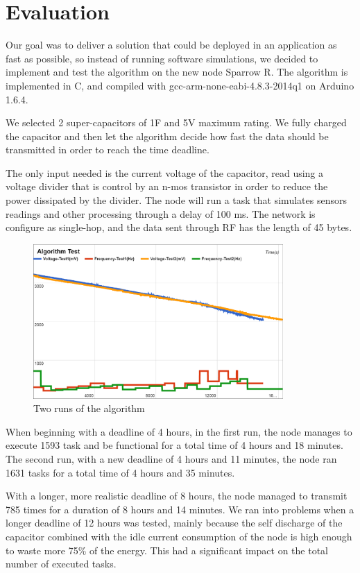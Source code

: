 \normalfont\normalsize
\chapter{Evaluation}

Our goal was to deliver a solution that could be deployed in an application as fast as possible, so
instead of running software simulations, we decided to implement and test the algorithm on the new
node Sparrow R. The algorithm is implemented in C, and compiled with gcc-arm-none-eabi-4.8.3-2014q1 on Arduino 1.6.4.

We selected 2 super-capacitors of 1F and 5V maximum rating. We fully charged the capacitor and then
let the algorithm decide how fast the data should be transmitted in order to reach the time
deadline.

The only input needed is the current voltage of the capacitor, read using a voltage divider that is
control by an n-mos transistor in order to reduce the power dissipated by the divider. The node
will run a task that simulates sensors readings and other processing through a delay of 100 ms. The
network is configure as single-hop, and the data sent through RF has the length of 45 bytes.

\begin{figure}[ht] \centering
\includegraphics[width=0.85\textwidth]{img/algtest.png}
\caption{Two runs of the algorithm}
\end{figure}

When beginning with a deadline of 4 hours, in the first run, the node manages to execute 1593 task and be
functional for a total time of 4 hours and 18 minutes. The second run, with a new deadline of 4
hours and 11 minutes, the node ran 1631 tasks for a total time of 4 hours and 35 minutes.

With a longer, more realistic deadline of 8 hours, the node managed to transmit 785 times for a
duration of 8 hours and 14 minutes. We ran into problems when a longer deadline of 12 hours was
tested, mainly because the self discharge of the capacitor combined with the idle current
consumption of the node is high enough to waste more 75\% of the energy. This had a significant
impact on the total number of executed tasks.



